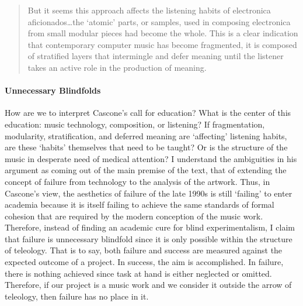 \begin{quote}
	But it seems this approach affects the listening habits of electronica aficionados\dots the `atomic' parts, or samples, used in composing electronica from small modular pieces had become the whole. This is a clear indication that contemporary computer music has become fragmented, it is composed of stratified layers that intermingle and defer meaning until the listener takes an active role in the production of meaning. \parencite[17]{Cas00:The}
\end{quote}

\paragraph{Unnecessary Blindfolds}
How are we to interpret Cascone's call for education? What is the center of this education: music technology, composition, or listening? If fragmentation, modularity, stratification, and deferred meaning are `affecting' listening habits, are these `habits' themselves that need to be taught? Or is the structure of the music in desperate need of medical attention? I understand the ambiguities in his argument as coming out of the main premise of the text, that of extending the concept of failure from technology to the analysis of the artwork. Thus, in Cascone's view, the aesthetics of failure of the late 1990s is still `failing' to enter academia because it is itself failing to achieve the same standards of formal cohesion that are required by the modern conception of the music work. Therefore, instead of finding an academic cure for blind experimentalism, I claim that failure is unnecessary blindfold since it is only possible within the structure of teleology. That is to say, both failure and success are measured against the expected outcome of a project. In success, the aim is accomplished. In failure, there is nothing achieved since task at hand is either neglected or omitted. Therefore, if our project is a music work and we consider it outside the arrow of teleology, then failure has no place in it.  


